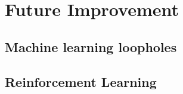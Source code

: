 \section{Future Improvement}

\subsection{Machine learning loopholes}

\subsection{Reinforcement Learning}